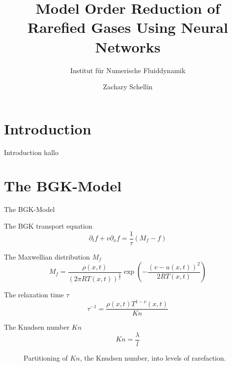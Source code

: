 \documentclass[Nike]{tuberlinbeamer}
\title{Model Order Reduction of Rarefied Gases Using Neural Networks}
\subtitle{Institut für Numerische Fluiddynamik}
\author[Zachary Schellin]{Zachary Schellin}
\institute{Technische Universität Berlin}
\begin{document}
\begin{frame}
\maketitle
\end{frame}


\begin{frame}
\tableofcontents
\end{frame}
\section{Introduction}
\begin{frame}[fragile]{Introduction}
 hallo
\end{frame}
\section{The BGK-Model}
\begin{frame}[fragile]{The BGK-Model}
	\begin{boxedminipage}{.4\textwidth}
		\centering
		The BGK transport equation
		\begin{equation}
		\partial_t f + v \partial_x f = \frac{1}{\tau} (M_f - f)
		\end{equation}
	\end{boxedminipage}%
\hspace{1.5cm}
	\begin{boxedminipage}{.45\textwidth}
		\centering
		The Maxwellian distribution $M_f$
		\begin{equation}
		M_f = \frac{\rho(x,t)}{(2\pi R T(x,t))^{\frac{3}{2}}}\exp(-\frac{(v - u(x,t))^2}{2 R T(x,t)}) 
		\end{equation}
	\end{boxedminipage}
\vspace{2cm}
	\begin{boxedminipage}{.4\textwidth}
		\centering
		The relaxation time $\tau$
		\begin{equation}
		\tau^{-1} = \frac{\rho(x,t)T^{1-\nu}(x,t)}{Kn}
		\end{equation}
	\end{boxedminipage}%
\hspace{1cm}
	\begin{boxedminipage}{.33\textwidth}
		\centering
		The Knudsen number $Kn$
		\begin{equation}
		Kn = \frac{\lambda}{l}
		\end{equation}
	\end{boxedminipage}
	\begin{figure}[H]
		
		\caption{Partitioning of $Kn$, the Knudsen number, into levels of rarefaction.}
		\label{Fig:ExpKN}
	\end{figure}
\end{frame}
\end{document}
